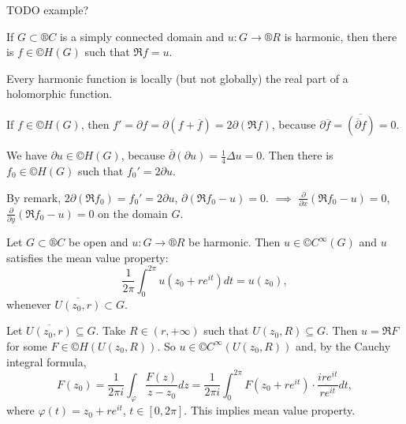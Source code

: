 \documentclass[12pt]{article}					%
\begin{document}
TODO example?

\begin{veta}
	If $G \subset ®C$ is a simply connected domain and $u: G \rightarrow ®R$ is harmonic, then there is $f \in ©H(G)$ such that $\Re f = u$.

	\begin{poznamkain}
		Every harmonic function is locally (but not globally) the real part of a holomorphic function.

		If $f \in ©H(G)$, then $f' = \partial f = \partial (f + \overline{f}) = 2\partial (\Re f)$, because $\partial \overline{f} = \overline{(\overline{\partial} f)} = 0$.
	\end{poznamkain}

	\begin{dukazin}
		We have $\partial u \in ©H(G)$, because $\overline{\partial}(\partial u) = \frac{1}{4}Δu = 0$. Then there is $f_0 \in ©H(G)$ such that $f_0' = 2\partial u$.

		By remark, $2\partial (\Re f_0) = f_0' = 2\partial u$, $\partial (\Re f_0 - u) = 0$. $\implies$ $\frac{\partial}{\partial x}(\Re f_0 - u) = 0$, $\frac{\partial}{\partial y}(\Re f_0 - u) = 0$ on the domain $G$.
	\end{dukazin}
\end{veta}

\begin{dusledek}
	Let $G \subset ®C$ be open and $u: G \rightarrow ®R$ be harmonic. Then $u \in ©C^∞(G)$ and $u$ satisfies the mean value property:
	$$ \frac{1}{2π}\int_0^{2π} u(z_0 + re^{it}) dt = u(z_0), $$
	whenever $\overline{U(z_0, r)} \subset G$.

	\begin{dukazin}
		Let $\overline{U(z_0, r)} \subseteq G$. Take $R \in (r, +∞)$ such that $U(z_0, R) \subseteq G$. Then  $u = \Re F$ for some $F \in ©H(U(z_0, R))$. So $u \in ©C^∞(U(z_0, R))$ and, by the Cauchy integral formula,
		$$ F(z_0) = \frac{1}{2πi} \int_φ \frac{F(z)}{z - z_0} dz = \frac{1}{2πi} \int_0^{2π} F(z_0 + re^{it})·\frac{ire^{it}}{re^{it}} dt, $$
		where $φ(t) = z_0 + re^{it}$, $t \in [0, 2π]$. This implies mean value property.
	\end{dukazin}
\end{dusledek}
\end{document}
